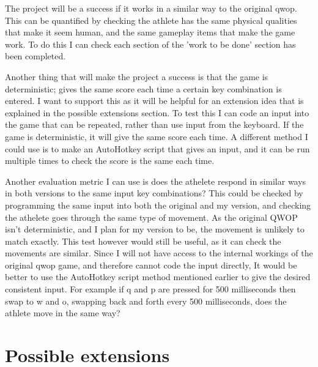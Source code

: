 \documentclass[12pt,a4paper,twoside]{article}
\begin{document}


The project will be a success if it works in a similar way to the original qwop. This can be quantified by checking the athlete has the same physical qualities that make it seem human, and the same  gameplay items that make the game work. To do this I can check each section of the 'work to be done' section has been completed.

Another thing that will make the project a success is that the game is deterministic; gives the same score each time a certain key combination is entered. I want to support this as it will be helpful for an extension idea that is explained in the possible extensions section. 
To test this I can code an input into the game that can be repeated, rather than use input from the keyboard. If the game is deterministic, it will give the same score each time. A different method I could use is to make an AutoHotkey script that gives an input, and it can be run multiple times to check the score is the same each time.

Another evaluation metric I can use is does the athelete respond in similar ways in both versions to the same input key combinations? This could be checked by programming the same input into both the original and my version, and checking the athelete goes through the same type of movement. 
As the original QWOP isn't deterministic, and I plan for my version to be, the movement is unlikely to match exactly. This test however would still be useful, as it can check the movements are similar.
Since I will not have access to the internal workings of the original qwop game, and therefore cannot code the input directly, It would be better to use the AutoHotkey script method mentioned earlier to give the desired consistent input.
For example if q and p are pressed for 500 milliseconds then swap to w and o, swapping back and forth every 500 milliseconds, does the athlete move in the same way?

\section*{Possible extensions}
\end{document}
